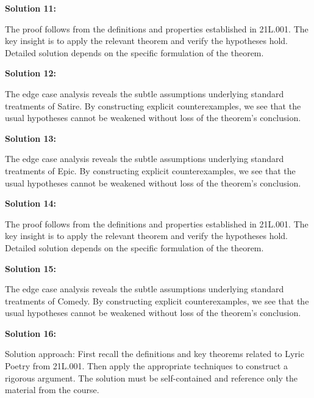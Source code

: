 \documentclass[12pt,a4paper]{exam}
\begin{document}
\vspace{0.5cm}

\textbf{Solution 11:}

The proof follows from the definitions and properties established in 21L.001. The key insight is to apply the relevant theorem and verify the hypotheses hold. Detailed solution depends on the specific formulation of the theorem.

\vspace{0.5cm}

\textbf{Solution 12:}

The edge case analysis reveals the subtle assumptions underlying standard treatments of Satire. By constructing explicit counterexamples, we see that the usual hypotheses cannot be weakened without loss of the theorem's conclusion.

\vspace{0.5cm}

\textbf{Solution 13:}

The edge case analysis reveals the subtle assumptions underlying standard treatments of Epic. By constructing explicit counterexamples, we see that the usual hypotheses cannot be weakened without loss of the theorem's conclusion.

\vspace{0.5cm}

\textbf{Solution 14:}

The proof follows from the definitions and properties established in 21L.001. The key insight is to apply the relevant theorem and verify the hypotheses hold. Detailed solution depends on the specific formulation of the theorem.

\vspace{0.5cm}

\textbf{Solution 15:}

The edge case analysis reveals the subtle assumptions underlying standard treatments of Comedy. By constructing explicit counterexamples, we see that the usual hypotheses cannot be weakened without loss of the theorem's conclusion.

\vspace{0.5cm}

\textbf{Solution 16:}

Solution approach: First recall the definitions and key theorems related to Lyric Poetry from 21L.001. Then apply the appropriate techniques to construct a rigorous argument. The solution must be self-contained and reference only the material from the course.
\end{document}
